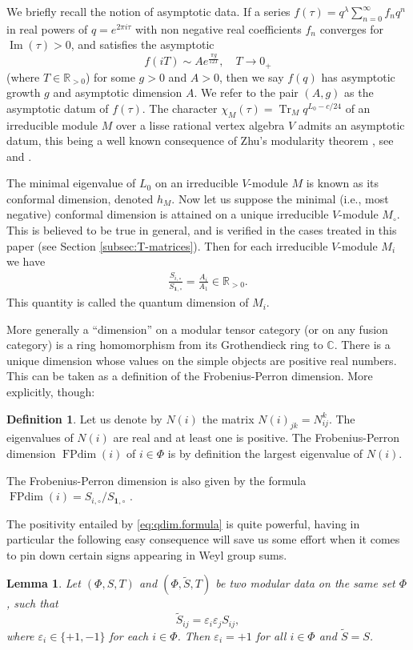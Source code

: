 \documentclass[12pt]{amsart}
\theoremstyle{plain}
\newtheorem{lemma}[thm]{Lemma}
\theoremstyle{definition}
\newtheorem{defn}[thm]{Definition}%
\numberwithin{equation}{section}
\DeclareMathOperator{\FPdim}{FPdim}
\DeclareMathOperator{\tr}{Tr}
\newcommand{\C}{\mathbb{C}}
\newcommand{\R}{\mathbb{R}}
\newcommand{\vac}{\mathbf{1}}
\begin{document}
We briefly recall the notion of asymptotic data. If a series $f(\tau) = q^\lambda \sum_{n=0}^\infty f_n q^n$ in real powers of $q = e^{2\pi i \tau}$ with non negative real coefficients $f_n$ converges for $\operatorname{Im}(\tau) > 0$, and satisfies the asymptotic
\[
f(iT) \sim A e^{\frac{\pi g}{12T}}, \quad T \rightarrow 0_+
\]
(where $T \in \R_{>0}$) for some $g >0$ and $A > 0$, then we say $f(q)$ has asymptotic growth $g$ and asymptotic dimension $A$. We refer to the pair $(A, g)$ as the asymptotic datum of $f(\tau)$. The character $\chi_M(\tau) = \tr_{M} q^{L_0-c/24}$ of an irreducible module $M$ over a lisse rational vertex algebra $V$ admits an asymptotic datum, this being a well known consequence of Zhu's modularity theorem {\cite{Zhu96}}, see \cite{DJX} and {\cite[Proposition 2.2]{AEM2024}}.

The minimal eigenvalue of $L_0$ on an irreducible $V$-module $M$ is known as its conformal dimension, denoted $h_M$. Now let us suppose the minimal (i.e., most negative) conformal dimension is attained on a unique irreducible $V$-module $M_\circ$. This is believed to be true in general, and is verified in the cases treated in this paper (see Section \ref{subsec:T-matrices}). Then for each irreducible $V$-module $M_i$ we have
\begin{align}\label{eq:qdim.formula}
\frac{S_{i, \circ}}{S_{\vac, \circ}} = \frac{A_i}{A_1} \in \R_{>0}.
\end{align}
This quantity is called the quantum dimension of $M_i$.

More generally a ``dimension'' on a modular tensor category (or on any fusion category) is a ring homomorphism from its Grothendieck ring to $\C$. There is a unique dimension whose values on the simple objects are positive real numbers. This can be taken as a definition of the Frobenius-Perron dimension. More explicitly, though:
\begin{defn}
Let us denote by $N(i)$ the matrix $N(i)_{jk} = N_{ij}^k$. The eigenvalues of $N(i)$ are real and at least one is positive. The Frobenius-Perron dimension $\FPdim(i)$ of $i \in \Phi$ is by definition the largest eigenvalue of $N(i)$.
\end{defn}
The Frobenius-Perron dimension is also given by the formula $\FPdim(i) = {S_{i, \circ}}/{S_{\vac, \circ}}$ \cite{GM}.

The positivity entailed by \eqref{eq:qdim.formula} is quite powerful, having in particular the following easy consequence will save us some effort when it comes to pin down certain signs appearing in Weyl group sums.
\begin{lemma}\label{lem:S.untwistable}
Let $(\Phi, S, T)$ and $(\Phi, \widetilde{S}, T)$ be two modular data on the same set $\Phi$, such that
\[
\widetilde{S}_{ij} = \varepsilon_i \varepsilon_j S_{ij},
\]
where $\varepsilon_{i} \in \{+1, -1\}$ for each $i \in \Phi$. Then $\varepsilon_i = +1$ for all $i \in \Phi$ and $\widetilde{S} = S$.
\end{lemma}
\end{document}
